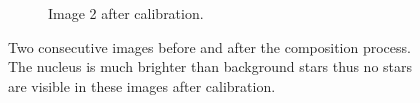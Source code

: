 \begin{figure}[htb]
\begin{subfigure}[b]{0.48\textwidth}
                \caption{Image 2 after calibration.}
                \label{fig:composition_after_2}
        \end{subfigure}
        \caption{Two consecutive images before and after the composition process. The nucleus is much brighter than background stars thus no stars are visible in these images after calibration.}
        \label{fig:composition_before_after}
\end{figure}



